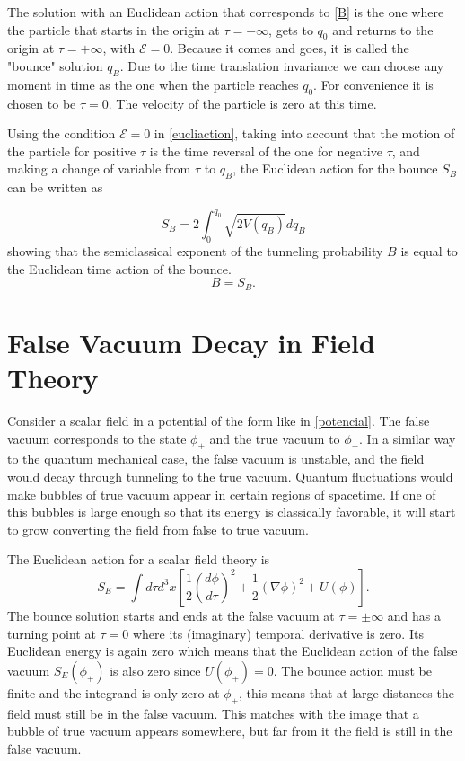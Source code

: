 \documentclass[a0,portrait]{a0poster}
\begin{document}
\begin{multicols}{3}
The solution with an Euclidean action that corresponds to \eqref{B} is the one where the particle that starts in the origin at $\tau = -\infty$, gets to $q_0$ and returns to the origin at $\tau = +\infty$, with $\mathcal{E} = 0$. Because it comes and goes, it is called the "bounce" solution $q_B$. Due to the time translation invariance we can choose any moment in time as the one when the particle reaches $q_0$. For convenience it is chosen to be $\tau = 0$. The velocity of the particle is zero at this time. 

Using the condition $\mathcal{E} = 0$ in \eqref{eucliaction}, taking into account that the motion of the particle for positive $\tau$ is the time reversal of the one for negative $\tau$, and making a change of variable from $\tau$ to $q_B$, the Euclidean action for the bounce $S_B$ can be written as

\begin{equation}
S_B = 2 \int_{0}^{q_0} \sqrt{2V(q_B)}dq_B
\end{equation}
showing that the semiclassical exponent of the tunneling probability $B$ is equal to the Euclidean time action of the bounce.
\begin{equation}
B = S_B.
\end{equation}

\section{False Vacuum Decay in Field Theory}
Consider a scalar field in a potential of the form like in \ref{potencial}. The false vacuum corresponds to the state $\phi_+$ and the true vacuum to $\phi_-$. In a similar way to the quantum mechanical case, the false vacuum is unstable, and the field would decay through tunneling to the true vacuum. Quantum fluctuations would make bubbles of true vacuum appear in certain regions of spacetime. If one of this bubbles is large enough so that its energy is classically favorable, it will start to grow converting the field from false to true vacuum.  

The Euclidean action for a scalar field theory is 
\begin{equation}
S_E = \int d\tau d^3x \left[ \frac{1}{2}\left(\frac{d\phi}{d\tau}\right)^2 + \frac{1}{2}(\nabla \phi)^2 + U(\phi) \right].
\end{equation}
The bounce solution starts and ends at the false vacuum at $\tau = \pm \infty$ and has a turning point at $\tau = 0$ where its (imaginary) temporal derivative is zero. Its Euclidean energy is again zero which means that the Euclidean action of the false vacuum $S_E(\phi_+)$ is also zero since $U(\phi_+) = 0$. The bounce action must be finite and the integrand is only zero at $\phi_+$, this means that at large distances the field must still be in the false vacuum. This matches with the image that a bubble of true vacuum appears somewhere, but far from it the field is still in the false vacuum. 


\end{multicols}
\end{document}
